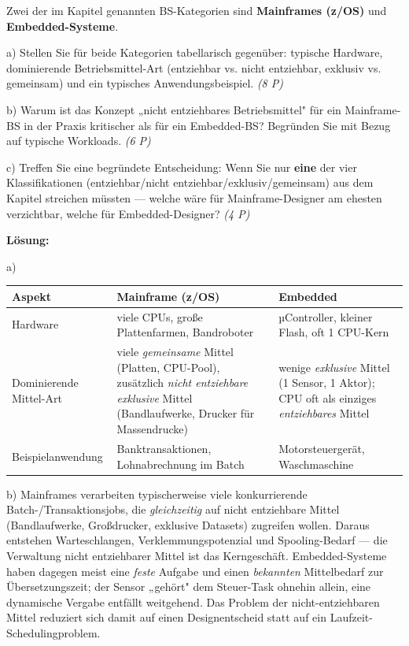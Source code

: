\documentclass[11pt, a4paper]{article}
\begin{document}
Zwei der im Kapitel genannten BS-Kategorien sind \textbf{Mainframes (z/OS)} und \textbf{Embedded-Systeme}.


a) Stellen Sie für beide Kategorien tabellarisch gegenüber: typische Hardware, dominierende Betriebsmittel-Art (entziehbar vs. nicht entziehbar, exklusiv vs. gemeinsam) und ein typisches Anwendungsbeispiel. \textit{(8 P)}


b) Warum ist das Konzept „nicht entziehbares Betriebsmittel" für ein Mainframe-BS in der Praxis kritischer als für ein Embedded-BS? Begründen Sie mit Bezug auf typische Workloads. \textit{(6 P)}


c) Treffen Sie eine begründete Entscheidung: Wenn Sie nur \textbf{eine} der vier Klassifikationen (entziehbar/nicht entziehbar/exklusiv/gemeinsam) aus dem Kapitel streichen müssten — welche wäre für Mainframe-Designer am ehesten verzichtbar, welche für Embedded-Designer? \textit{(4 P)}


\textbf{Lösung:}


a)



{\small
\begin{tabularx}{\linewidth}{XXX}
\hline
\rowcolor{tableheadbg}
{\color{white}\textbf{Aspekt}} & {\color{white}\textbf{Mainframe (z/OS)}} & {\color{white}\textbf{Embedded}} \\[2pt]
\hline
\endhead
\hline
\endfoot
Hardware & viele CPUs, große Plattenfarmen, Bandroboter & µController, kleiner Flash, oft 1 CPU-Kern \\
Dominierende Mittel-Art & viele \textit{gemeinsame} Mittel (Platten, CPU-Pool), zusätzlich \textit{nicht entziehbare exklusive} Mittel (Bandlaufwerke, Drucker für Massendrucke) & wenige \textit{exklusive} Mittel (1 Sensor, 1 Aktor); CPU oft als einziges \textit{entziehbares} Mittel \\
Beispielanwendung & Banktransaktionen, Lohnabrechnung im Batch & Motorsteuergerät, Waschmaschine \\
\end{tabularx}
}


b) Mainframes verarbeiten typischerweise viele konkurrierende Batch-/Transaktionsjobs, die \textit{gleichzeitig} auf nicht entziehbare Mittel (Bandlaufwerke, Großdrucker, exklusive Datasets) zugreifen wollen. Daraus entstehen Warteschlangen, Verklemmungspotenzial und Spooling-Bedarf — die Verwaltung nicht entziehbarer Mittel ist das Kerngeschäft. Embedded-Systeme haben dagegen meist eine \textit{feste} Aufgabe und einen \textit{bekannten} Mittelbedarf zur Übersetzungszeit; der Sensor „gehört" dem Steuer-Task ohnehin allein, eine dynamische Vergabe entfällt weitgehend. Das Problem der nicht-entziehbaren Mittel reduziert sich damit auf einen Designentscheid statt auf ein Laufzeit-Schedulingproblem.
\end{document}
